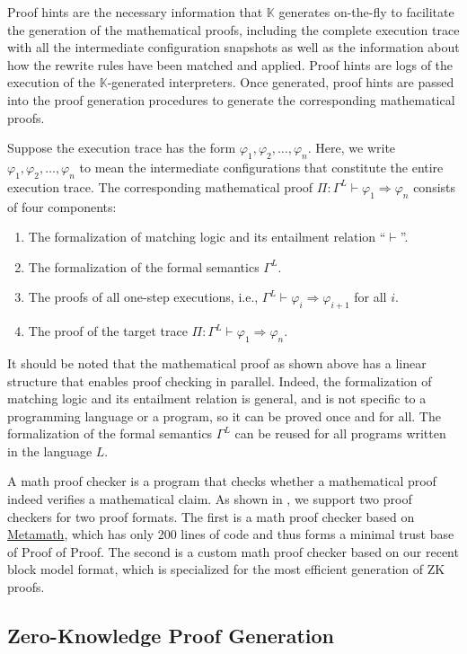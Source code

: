 \documentclass{article}
\newcommand{\K}{\ensuremath{\mathbb{K}}\xspace}
\newcommand{\To}{\Rightarrow}
\begin{document}
Proof hints are the necessary information that \K generates on-the-fly
to facilitate the generation of the mathematical proofs,
including
the complete execution trace with all the intermediate configuration snapshots
as well as the information about how the rewrite rules have been matched and applied.
Proof hints are logs of the execution of the \K-generated interpreters.
Once generated, proof hints are passed into the proof generation procedures to generate the corresponding mathematical proofs.

Suppose the execution trace has the form $\varphi_1, \varphi_2,\dots,\varphi_n$.
Here, we write $\varphi_1,\varphi_2,\dots,\varphi_n$ to mean the intermediate configurations
that constitute the entire execution trace.
The corresponding mathematical proof
$\Pi \colon \Gamma^L \vdash \varphi_1 \To \varphi_n$ consists of four components:
\begin{enumerate}
\item The formalization of matching logic and its entailment relation ``$\vdash$''.
\item The formalization of the formal semantics $\Gamma^L$.
\item The proofs of all one-step executions, i.e.,
$\Gamma^L \vdash \varphi_i \To \varphi_{i+1}$ for all $i$.
\item The proof of the target trace
$\Pi \colon \Gamma^L \vdash \varphi_1 \To \varphi_n$.
\end{enumerate}
It should be noted that the mathematical proof as shown above has a linear structure
that enables proof checking in parallel.
Indeed, the formalization of matching logic and its entailment relation is
general, and is not specific to a programming language or a program,
so it can be proved once and for all.
The formalization of the formal semantics $\Gamma^L$ can be reused for all programs written
in the language $L$.

A math proof checker is a program that checks whether a mathematical proof
indeed verifies a mathematical claim.
As shown in , we support two proof checkers for two proof formats.
The first is a math proof checker based on \href{https://metamath.org}{Metamath}, which has only 200 lines of code and thus forms a minimal trust base of Proof of Proof.
The second is a custom math proof checker based on our recent block model format, which is specialized
for the most efficient generation of ZK proofs.

\subsection{Zero-Knowledge Proof Generation}
\end{document}
